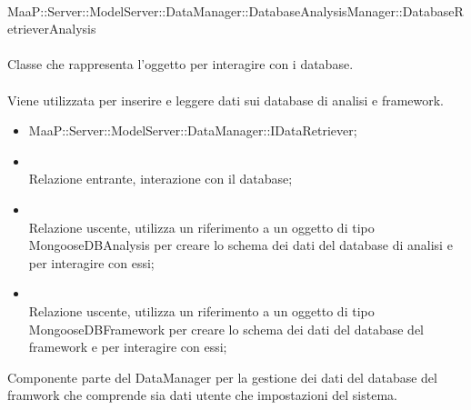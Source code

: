 \\
MaaP::Server::ModelServer::DataManager::DatabaseAnalysisManager::DatabaseRetrieverAnalysis\\
\\
Classe che rappresenta l'oggetto per interagire con i database.\\
\\
Viene utilizzata per inserire e leggere dati sui database di analisi e framework.\\
\begin{itemize}
\item MaaP::Server::ModelServer::DataManager::IDataRetriever;
\end{itemize}
\begin{itemize}
\item{}\\
Relazione entrante, interazione con il database;
\item{}\\
Relazione uscente, utilizza un riferimento a un oggetto di tipo MongooseDBAnalysis per creare lo schema dei dati del database di analisi e per interagire con essi;
\item{}\\
Relazione uscente, utilizza un riferimento a un oggetto di tipo MongooseDBFramework per creare lo schema dei dati del database del framework e per interagire con essi;
\end{itemize}


Componente parte del DataManager per la gestione dei dati del database del framwork che comprende sia dati utente che impostazioni del sistema.

